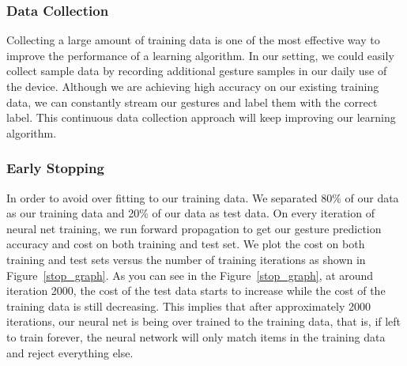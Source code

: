 \subsubsection{Data Collection}
Collecting a large amount of training data is one of the most effective way to improve the performance of a learning algorithm. In our setting, we could easily collect sample data by recording additional gesture samples in our daily use of the device. Although we are achieving high accuracy on our existing training data, we can constantly stream our gestures and label them with the correct label. This continuous data collection approach will keep improving our learning algorithm.

\subsubsection{Early Stopping}
In order to avoid over fitting to our training data. We separated 80\% of our data as our training data and 20\% of our data as test data. On every iteration of neural net training, we run  forward propagation to get our gesture prediction accuracy and cost on both training and test set. We plot the cost on both training and test sets versus the number of training iterations as shown in Figure~\ref{stop_graph}. As you can see in the Figure~\ref{stop_graph}, at around iteration 2000, the cost of the test data starts to increase while the cost of the training data is still decreasing. This implies that after approximately 2000 iterations, our neural net is being over trained to the training data, that is, if left to train forever, the neural network will only match items in the training data and reject everything else.

